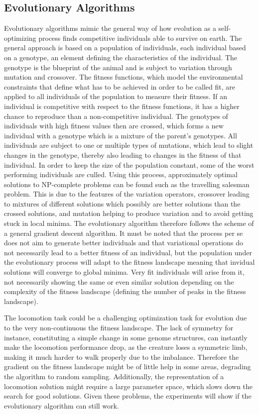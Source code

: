 \documentclass[main]{subfiles}
\begin{document}
\subsection{Evolutionary Algorithms}

Evolutionary algorithms mimic the general way of how evolution as a self-optimizing process finds competitive individuals able to survive on earth. The general approach is based on a population of individuals, each individual based on a genotype, an element defining the characteristics of the individual. The genotype is the blueprint of the animal and is subject to variation through mutation and crossover. The fitness functions, which model the environmental constraints that define what has to be achieved in order to be called fit, are applied to all individuals of the population to measure their fitness. If an individual is competitive with respect to the fitness functions, it has a higher chance to reproduce than a non-competitive individual. The genotypes of individuals with high fitness values then are crossed, which forms a new individual with a genotype which is a mixture of the parent's genotypes. All individuals are subject to one or multiple types of mutations, which lead to slight changes in the genotype, thereby also leading to changes in the fitness of that individual. In order to keep the size of the population constant, some of the worst performing individuals are culled. Using this process, approximately optimal solutions to NP-complete problems can be found such as the travelling salesman problem. This is due to the features of the variation operators, crossover leading to mixtures of different solutions which possibly are better solutions than the crossed solutions, and mutation helping to produce variation and to avoid getting stuck in local minima. The evolutionary algorithm therefore follows the scheme of a general gradient descent algorithm. It must be noted that the process per se does not aim to generate better individuals and that variational operations do not necessarily lead to a better fitness of an individual, but the population under the evolutionary process will adapt to the fitness landscape meaning that invidual solutions will converge to global minima. Very fit individuals will arise from it, not necessarily showing the same or even similar solution depending on the complexity of the fitness landscape (defining the number of peaks in the fitness landscape). 

The locomotion task could be a challenging optimization task for evolution due to the very non-continuous the fitness landscape. The lack of symmetry for instance, constituting a simple change in some genome structures, can instantly make the locomotion performance drop, as the creature loses a symmetric limb, making it much harder to walk properly due to the imbalance. Therefore the gradient on the fitness landscape might be of little help in some areas, degrading the algorithm to random sampling. Additionally, the representation of a locomotion solution might require a large parameter space, which slows down the search for good solutions. Given these problems, the experiments will show if the evolutionary algorithm can still work.
\end{document}
